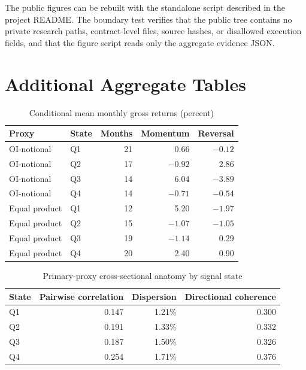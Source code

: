 The public figures can be rebuilt with the standalone script described in the project
README. The boundary test verifies that the public tree contains no private research
paths, contract-level files, source hashes, or disallowed execution fields, and that the
figure script reads only the aggregate evidence JSON.

\section{Additional Aggregate Tables}

\begin{table}[H]
\centering
\caption{Conditional mean monthly gross returns (percent)}
\begin{tabular}{llrrr}
\toprule
Proxy & State & Months & Momentum & Reversal \\
\midrule
OI-notional & Q1 & 21 & 0.66 & $-0.12$ \\
OI-notional & Q2 & 17 & $-0.92$ & 2.86 \\
OI-notional & Q3 & 14 & 6.04 & $-3.89$ \\
OI-notional & Q4 & 14 & $-0.71$ & $-0.54$ \\
\midrule
Equal product & Q1 & 12 & 5.20 & $-1.97$ \\
Equal product & Q2 & 15 & $-1.07$ & $-1.05$ \\
Equal product & Q3 & 19 & $-1.14$ & 0.29 \\
Equal product & Q4 & 20 & 2.40 & 0.90 \\
\bottomrule
\end{tabular}
\end{table}

\begin{table}[H]
\centering
\caption{Primary-proxy cross-sectional anatomy by signal state}
\begin{tabular}{lrrr}
\toprule
State & Pairwise correlation & Dispersion & Directional coherence \\
\midrule
Q1 & 0.147 & 1.21\% & 0.300 \\
Q2 & 0.191 & 1.33\% & 0.332 \\
Q3 & 0.187 & 1.50\% & 0.326 \\
Q4 & 0.254 & 1.71\% & 0.376 \\
\bottomrule
\end{tabular}
\end{table}
